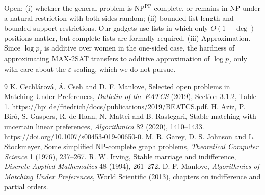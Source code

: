 \documentclass[11pt]{article}
\theoremstyle{definition}
\begin{document}
Open: (i) whether the general problem is $\mathrm{NP}^{\mathrm{PP}}$-complete, or remains in NP under a natural
restriction with both sides random; (ii) bounded-list-length and bounded-support restrictions. Our gadgets use lists in
which only $O(1+\deg)$ positions matter, but complete lists are formally required. (iii) Approximation. Since
$\log p_I$ is additive over women in the one-sided case, the hardness of approximating MAX-2SAT transfers to additive
approximation of $\log p_I$ only with care about the $\varepsilon$ scaling, which we do not pursue.

\begin{thebibliography}{9}
 K. Cechl\'arov\'a, \'A. Cseh and D. F. Manlove, Selected open problems in Matching Under Preferences,
\emph{Bulletin of the EATCS} (2019), Section 3.1.2, Table 1. \url{https://hpi.de/friedrich/docs/publications/2019/BEATCS.pdf}.
 H. Aziz, P. Bir\'o, S. Gaspers, R. de Haan, N. Mattei and B. Rastegari, Stable matching with uncertain
linear preferences, \emph{Algorithmica} 82 (2020), 1410--1433. \url{https://doi.org/10.1007/s00453-019-00650-0}.
 M. R. Garey, D. S. Johnson and L. Stockmeyer, Some simplified NP-complete graph problems,
\emph{Theoretical Computer Science} 1 (1976), 237--267.
 R. W. Irving, Stable marriage and indifference, \emph{Discrete Applied Mathematics} 48 (1994), 261--272.
 D. F. Manlove, \emph{Algorithmics of Matching Under Preferences}, World Scientific (2013), chapters on
indifference and partial orders.
\end{thebibliography}
\end{document}

